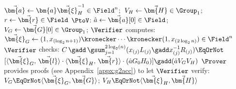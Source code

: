 \begin{algorithm}[!t]
		\Indp
	$\vec{\bm{a}} \leftarrow \bm{a} \vec{\bm{\xi}}_H^{-1} \in \Field^n$;\,	$V_H \leftarrow \vec{\bm{H}} \in \Group_1$;\, $r\leftarrow \vec{\bm{r}} \in \Field$\;
    \label{line:computear}
	\Indm
		$\PtoV$: $\hat{a} \leftarrow \vec{\bm{a}}[0] \in \Field$; $V_G \leftarrow \vec{\bm{G}}[0] \in \Group_1$; \;
	\label{line:reduceHata}
		$\Verifier$ computes:\\
	\Indp
		$\vec{\bm{\xi}}_G \leftarrow (1, x_{(\log_2 n +1)}) \kronecker \cdots \kronecker (1, x_{(2\log_2 n)}) \in \Field^n$\;
		\Indm
	$\Verifier$ checks:
		$C\, \gadd \, \gsum_{j=1}^{2\log_2(n)} (x_{(j)} L_{(j)} \gadd x_{(j)}^{-1}R_{(j)}) \EqOrNot$ 
		$ 
        [\langle \vec{\bm{\xi}}_G ,\,\vec{\bm{l}}\rangle \cdot
        \langle \vec{\bm{\xi}}_H ,\, \vec{\bm{r}} \rangle
        \cdot (\hat{a} G_0 H_0)]
		\gadd
		(\hat{a} V_G V_H)
		$\;
		\label{line:verifierPCS}
	$\Prover$ provides proofs (see Appendix~\ref{appx:g2acc}) to let $\Verifier$ verify:
		$V_G \EqOrNot \langle \vec{\bm{\xi}}_G , \vec{\bm{G}}\rangle$; $ V_H \EqOrNot \langle \vec{\bm{\xi}}_H, \vec{\bm{H}} \rangle$\;
        \label{line:gtbulletfinalcheck}
\end{algorithm}
